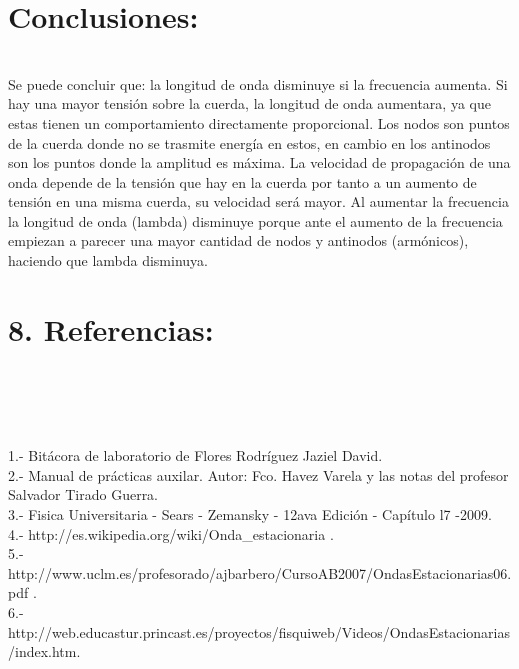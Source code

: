 \documentclass[10pt,a4paper]{article}
\begin{document}
\section*{ Conclusiones:}\\
Se puede concluir que: la longitud de onda disminuye si la frecuencia aumenta. Si hay una mayor tensi\'{o}n sobre la cuerda, la longitud de onda aumentara, ya que estas tienen un comportamiento directamente proporcional. Los nodos son puntos de la cuerda donde no se trasmite energ\'{i}a en estos, en cambio en los antinodos son los puntos donde la amplitud es m\'{a}xima. La velocidad de propagaci\'{o}n de una onda depende de la tensi\'{o}n que hay en la cuerda por tanto a un aumento de tensi\'{o}n en una misma cuerda, su velocidad ser\'{a} mayor. Al aumentar la frecuencia la longitud de onda (lambda) disminuye porque ante el aumento de la frecuencia empiezan a parecer una mayor cantidad de nodos y antinodos (arm\'{o}nicos), haciendo que lambda disminuya.

\section*{8. Referencias:}\\
\\
\medskip
\\
\\1.- Bit\'{a}cora de laboratorio de Flores Rodr\'{i}guez Jaziel David.
\\
2.- Manual de pr\'{a}cticas auxilar. Autor: Fco. Havez Varela y las notas del profesor Salvador Tirado Guerra.
\\
3.- Fisica Universitaria - Sears - Zemansky - 12ava Edici\'{o}n - Cap\'{i}tulo l7 -2009.\\
4.- http://es.wikipedia.org/wiki/Onda_estacionaria .\\ 
5.- http://www.uclm.es/profesorado/ajbarbero/CursoAB2007/OndasEstacionarias06.pdf .\\
6.- http://web.educastur.princast.es/proyectos/fisquiweb/Videos/OndasEstacionarias/index.htm.
\\
\end{document}

